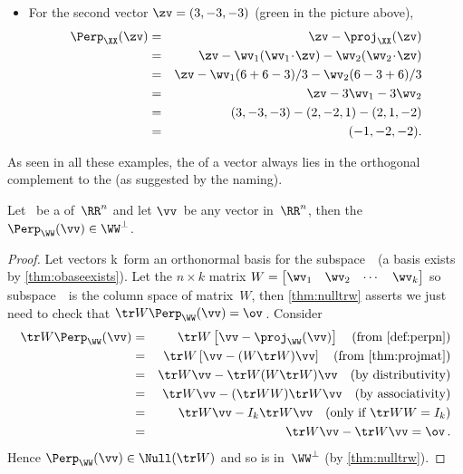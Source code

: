 \begin{reduce}
\begin{example}
\begin{enumerate}[ref=\ref{eg:perpn}(\alph*)]
\begin{solution}
\begin{itemize}
\item For the second vector \(\zv=(3,-3,-3)\) (green in the picture above),
\begin{eqnarray*}
\Perp_\XX(\zv)
&=&\zv-\proj_\XX(\zv)
\\&=&\zv-\wv_1(\wv_1\cdot\zv)-\wv_2(\wv_2\cdot\zv)
\\&=&\zv-\wv_1(6+6-3)/3-\wv_2(6-3+6)/3
\\&=&\zv-3\wv_1-3\wv_2
\\&=&(3,-3,-3)-(2,-2,1)-(2,1,-2)
\\&=&(-1,-2,-2).
\end{eqnarray*}
\end{itemize}
\end{solution}

\end{enumerate}
\end{example}


As seen in all these examples, the  of a vector always lies in the orthogonal complement to the   (as suggested by the naming).


\begin{theorem} \label{thm:perpn}
Let \WW\ be a  of~\(\RR^n\) and let \(\vv\)~be any vector in~\(\RR^n\), then the  \(\Perp_\WW(\vv)\in\WW^\perp\).
\end{theorem}

\begin{proof} 
Let vectors \hlist\wv k\ form an orthonormal basis for the subspace~\WW\ (a basis exists by \cref{thm:obaseexists}).
Let the \(n\times k\) matrix \(W=\begin{bmatrix} \wv_1&\wv_2&\cdots&\wv_k \end{bmatrix}\) so subspace~\WW\ is the column space of matrix~\(W\), then \cref{thm:nulltrw} asserts we just need to check that \(\tr W\Perp_\WW(\vv)=\ov\)\,.
Consider 
\begin{eqnarray*}
\tr W\Perp_\WW(\vv)
&=&\tr W\left[\vv-\proj_\WW(\vv)\right]
\quad(\text{from \cref{def:perpn}})
\\&=&\tr W\left[\vv-(W\tr W)\vv\right]
\quad(\text{from \cref{thm:projmat}})
\\&=&\tr W\vv-\tr W(W\tr W)\vv
\quad(\text{by distributivity})
\\&=&\tr W\vv-(\tr WW)\tr W\vv 
\quad(\text{by associativity})
\\&=&\tr W\vv-I_k\tr W\vv 
\quad(\text{only if }\tr WW=I_k)
\\&=&\tr W\vv-\tr W\vv =\ov\,.
\end{eqnarray*}
Hence \(\Perp_\WW(\vv)\in\Null(\tr W)\) and so is in~\(\WW^\perp\) (by \cref{thm:nulltrw}).


\end{proof}
\end{reduce}

